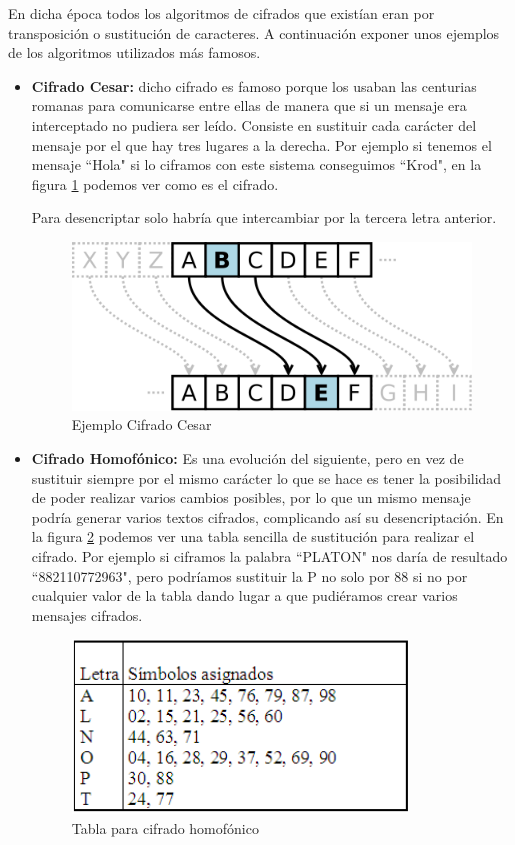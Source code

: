 	En dicha época todos los algoritmos de cifrados que existían eran por transposición o sustitución de caracteres. A continuación exponer unos ejemplos de los algoritmos utilizados más famosos. 
\begin{itemize}

	\item \textbf{Cifrado Cesar:} dicho cifrado es famoso porque los usaban las centurias romanas para comunicarse entre ellas de manera que si un mensaje era interceptado no pudiera ser leído. Consiste en sustituir cada carácter del mensaje por el que hay tres lugares a la derecha. Por ejemplo si tenemos el mensaje ``Hola" si lo ciframos con este sistema conseguimos ``Krod", en la figura \ref{fig:cifradoCesar} podemos ver como es el cifrado.
	
	Para desencriptar solo habría que intercambiar por la tercera letra anterior.

\begin{figure}[h]
  \centering
    \includegraphics[scale=0.6]{./ConocimientosPrevios/imagenes/cifradoCesar.png}
  \caption{Ejemplo Cifrado Cesar}
  \label{fig:cifradoCesar}
\end{figure} 

	\item \textbf{Cifrado Homofónico:} Es una evolución del siguiente, pero en vez de sustituir siempre por el mismo carácter lo que se hace es tener la posibilidad de poder realizar varios cambios posibles, por lo que un mismo mensaje podría generar varios textos cifrados, complicando así su desencriptación. En la figura \ref{fig:cifradoHomofonico} podemos ver una tabla sencilla de sustitución para realizar el cifrado. Por ejemplo si ciframos la palabra ``PLATON" nos daría de resultado ``882110772963", pero podríamos sustituir la P no solo por 88 si no por cualquier valor de la tabla dando lugar a que pudiéramos crear varios mensajes cifrados.
	
\begin{figure}[h]
  \centering
    \includegraphics[scale=0.7]{./ConocimientosPrevios/imagenes/cifradoHomofonico.png}
  \caption{Tabla para cifrado homofónico}
  \label{fig:cifradoHomofonico}
\end{figure}


\end{itemize}
